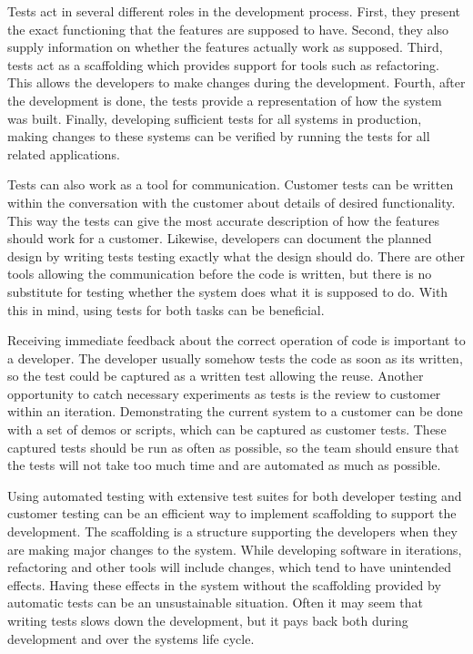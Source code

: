 Tests act in several different roles in the development process. First, they present the exact functioning that the features are supposed to have. Second, they also supply information on whether the features actually work as supposed. Third, tests act as a scaffolding which provides support for tools such as refactoring. This allows the developers to make changes during the development. Fourth, after the development is done, the tests provide a representation of how the system was built. Finally, developing sufficient tests for all systems in production, making changes to these systems can be verified by running the tests for all related applications.

Tests can also work as a tool for communication. Customer tests can be written within the conversation with the customer about details of desired functionality. This way the tests can give the most accurate description of how the features should work for a customer. Likewise, developers can document the planned design by writing tests testing exactly what the design should do. There are other tools allowing the communication before the code is written, but there is no substitute for testing whether the system does what it is supposed to do. With this in mind, using tests for both tasks can be beneficial.

Receiving immediate feedback about the correct operation of code is important to a developer. The developer usually somehow tests the code as soon as its written, so the test could be captured as a written test allowing the reuse. Another opportunity to catch necessary experiments as tests is the review to customer within an iteration. Demonstrating the current system to a customer can be done with a set of demos or scripts, which can be captured as customer tests. These captured tests should be run as often as possible, so the team should ensure that the tests will not take too much time and are automated as much as possible.

Using automated testing with extensive test suites for both developer testing and customer testing can be an efficient way to implement scaffolding to support the development. The scaffolding is a structure supporting the developers when they are making major changes to the system. While developing software in iterations, refactoring and other tools will include changes, which tend to have unintended effects. Having these effects in the system without the scaffolding provided by automatic tests can be an unsustainable situation. Often it may seem that writing tests slows down the development, but it pays back both during development and over the systems life cycle.

